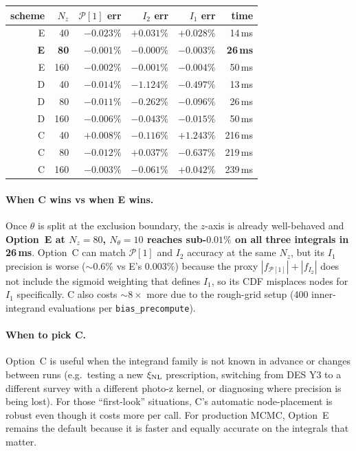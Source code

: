 \documentclass[11pt]{article}
\newcommand{\xinl}{\xi_{\rm NL}}
\newcommand{\Pop}{\mathcal{P}}
\begin{document}
\vspace{4pt}
\begin{center}
\small
\begin{tabular}{r r r r r r}
\toprule
scheme & \(N_z\) & \(\Pop[1]\) err & \(I_2\) err & \(I_1\) err & time \\
\midrule
E & 40  & \(-0.023\%\) & \(+0.031\%\) & \(+0.028\%\) & 14\,ms \\
\textbf{E} & \textbf{80}  & \(\mathbf{-0.001\%}\) & \(\mathbf{-0.000\%}\) & \(\mathbf{-0.003\%}\) & \textbf{26\,ms} \\
E & 160 & \(-0.002\%\) & \(-0.001\%\) & \(-0.004\%\) & 50\,ms \\
\midrule
D & 40  & \(-0.014\%\) & \(-1.124\%\) & \(-0.497\%\) & 13\,ms \\
D & 80  & \(-0.011\%\) & \(-0.262\%\) & \(-0.096\%\) & 26\,ms \\
D & 160 & \(-0.006\%\) & \(-0.043\%\) & \(-0.015\%\) & 50\,ms \\
\midrule
C & 40  & \(+0.008\%\) & \(-0.116\%\) & \(+1.243\%\) & 216\,ms \\
C & 80  & \(-0.012\%\) & \(+0.037\%\) & \(-0.637\%\) & 219\,ms \\
C & 160 & \(-0.003\%\) & \(-0.061\%\) & \(+0.042\%\) & 239\,ms \\
\bottomrule
\end{tabular}
\end{center}

\paragraph{When C wins vs when E wins.}
Once \(\theta\) is split at the exclusion boundary, the
\(z\)-axis is already well-behaved and \textbf{Option~E at
\(N_z=80\), \(N_\theta=10\) reaches sub-\(0.01\%\) on all three
integrals in 26\,ms}. Option~C can match \(\Pop[1]\) and \(I_2\)
accuracy at the same \(N_z\), but its \(I_1\) precision is worse
(\(\sim 0.6\%\) vs E's \(0.003\%\)) because the proxy
\(|f_{\Pop[1]}|+|f_{I_2}|\) does not include the sigmoid weighting
that defines \(I_1\), so its CDF misplaces nodes for \(I_1\)
specifically. C also costs \(\sim 8\times\) more due to the rough-grid
setup (400 inner-integrand evaluations per
\texttt{bias\_precompute}).

\paragraph{When to pick C.}
Option~C is useful when the integrand family is not known in
advance or changes between runs (e.g.\ testing a new \(\xinl\)
prescription, switching from DES Y3 to a different survey with a
different photo-z kernel, or diagnosing where precision is being
lost). For those ``first-look'' situations, C's automatic
node-placement is robust even though it costs more per call. For
production MCMC, Option~E remains the default because it is faster
and equally accurate on the integrals that matter.
\end{document}
